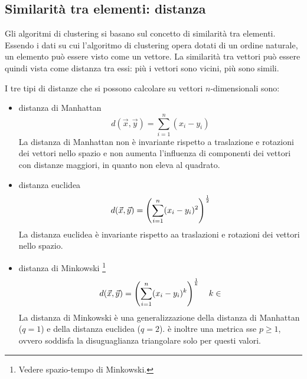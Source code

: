 \subsection{Similarità tra elementi: distanza}
Gli algoritmi di clustering si basano sul concetto di similarità tra elementi.
Essendo i dati su cui l'algoritmo di clustering opera dotati di un ordine
naturale, un elemento può essere visto come un vettore.
La similarità tra vettori può essere quindi vista come distanza tra essi: più i
vettori sono vicini, più sono simili.

I tre tipi di distanze che si possono calcolare su vettori $n$-dimensionali
sono:
\begin{itemize}
    \item distanza di Manhattan
    \[
        d(\vec{x}, \vec{y}) = \sum\limits_{i=1}^n (x_i - y_i)
    \]
    La distanza di Manhattan non è invariante rispetto a traslazione e rotazioni
    dei vettori nello spazio e non aumenta l'influenza di componenti dei vettori
    con distanze maggiori, in quanto non eleva al quadrato.
    \item distanza euclidea
    \[
        d(\vec{x}, \vec{y}) = 
        \left(\sum\limits_{i=1}^n (x_i - y_i)^2\right)^{\frac{1}{2}}
    \]
    La distanza euclidea è invariante rispetto aa traslazioni e rotazioni dei
    vettori nello spazio.
    \item distanza di Minkowski \footnote{Vedere spazio-tempo di Minkowski.}
    \[
        d(\vec{x}, \vec{y}) = 
        \left(\sum\limits_{i=1}^n (x_i - y_i)^k\right)^{\frac{1}{k}} \quad k \in 
    \]
    La distanza di Minkowski è una generalizzazione della distanza di Manhattan
    ($q=1$) e della distanza euclidea ($q=2$).
    è inoltre una metrica sse $p \ge 1$, ovvero soddisfa la disuguaglianza
    triangolare solo per questi valori.
\end{itemize}